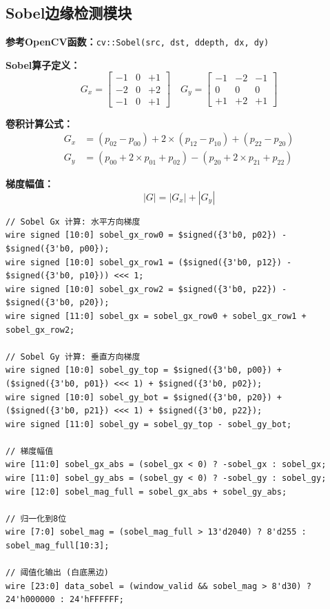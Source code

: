 \documentclass[12pt,hyperref,a4paper,UTF8]{ctexart}
\begin{document}
\subsection{Sobel边缘检测模块}

\textbf{参考OpenCV函数：}\texttt{cv::Sobel(src, dst, ddepth, dx, dy)}

\textbf{Sobel算子定义：}
\begin{equation}
G_x = \begin{bmatrix} -1 & 0 & +1 \\ -2 & 0 & +2 \\ -1 & 0 & +1 \end{bmatrix} \quad
G_y = \begin{bmatrix} -1 & -2 & -1 \\ 0 & 0 & 0 \\ +1 & +2 & +1 \end{bmatrix}
\end{equation}

\textbf{卷积计算公式：}
\begin{align}
G_x &= (p_{02} - p_{00}) + 2 \times (p_{12} - p_{10}) + (p_{22} - p_{20}) \\
G_y &= (p_{00} + 2 \times p_{01} + p_{02}) - (p_{20} + 2 \times p_{21} + p_{22})
\end{align}

\textbf{梯度幅值：}
\begin{equation}
|G| = |G_x| + |G_y|
\end{equation}

\begin{lstlisting}[caption={Sobel边缘检测代码}]
// Sobel Gx 计算: 水平方向梯度
wire signed [10:0] sobel_gx_row0 = $signed({3'b0, p02}) - $signed({3'b0, p00});
wire signed [10:0] sobel_gx_row1 = ($signed({3'b0, p12}) - $signed({3'b0, p10})) <<< 1;
wire signed [10:0] sobel_gx_row2 = $signed({3'b0, p22}) - $signed({3'b0, p20});
wire signed [11:0] sobel_gx = sobel_gx_row0 + sobel_gx_row1 + sobel_gx_row2;

// Sobel Gy 计算: 垂直方向梯度
wire signed [10:0] sobel_gy_top = $signed({3'b0, p00}) + ($signed({3'b0, p01}) <<< 1) + $signed({3'b0, p02});
wire signed [10:0] sobel_gy_bot = $signed({3'b0, p20}) + ($signed({3'b0, p21}) <<< 1) + $signed({3'b0, p22});
wire signed [11:0] sobel_gy = sobel_gy_top - sobel_gy_bot;

// 梯度幅值
wire [11:0] sobel_gx_abs = (sobel_gx < 0) ? -sobel_gx : sobel_gx;
wire [11:0] sobel_gy_abs = (sobel_gy < 0) ? -sobel_gy : sobel_gy;
wire [12:0] sobel_mag_full = sobel_gx_abs + sobel_gy_abs;

// 归一化到8位
wire [7:0] sobel_mag = (sobel_mag_full > 13'd2040) ? 8'd255 : sobel_mag_full[10:3];

// 阈值化输出 (白底黑边)
wire [23:0] data_sobel = (window_valid && sobel_mag > 8'd30) ? 24'h000000 : 24'hFFFFFF;
\end{lstlisting}
\end{document}
